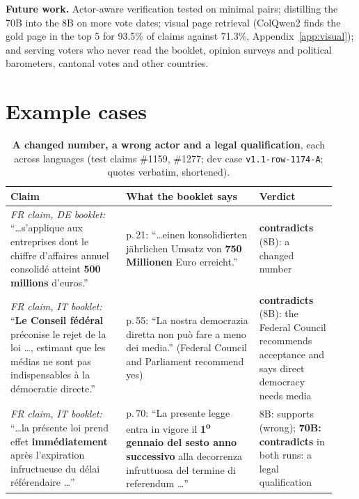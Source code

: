 \documentclass[10pt,a4paper]{article}
\begin{document}
\textbf{Future work.} Actor-aware verification tested on minimal pairs; distilling the 70B into the 8B
on more vote dates; visual page retrieval (ColQwen2 finds the gold page in the top 5 for 93.5\% of
claims against 71.3\%, Appendix~\ref{app:visual}); and serving voters who never read the booklet,
opinion surveys and political barometers, cantonal votes and other countries.

\footnotesize


\normalsize

\appendix
\section{Example cases}\label{app:cases}
\begin{table}[H]
\centering\footnotesize
\begin{tabular}{@{}L{0.33\linewidth}L{0.38\linewidth}L{0.22\linewidth}@{}}
\toprule
Claim & What the booklet says & Verdict \\
\midrule
\emph{FR claim, DE booklet:} ``\ldots s'applique aux entreprises dont le chiffre d'affaires annuel
consolidé atteint \textbf{500 millions} d'euros.'' &
p.\,21: ``\ldots einen konsolidierten jährlichen Umsatz von \textbf{750 Millionen} Euro erreicht.'' &
\textbf{contradicts} (8B): a changed number \\[3pt]
\emph{FR claim, IT booklet:} ``\textbf{Le Conseil fédéral} préconise le rejet de la loi \ldots,
estimant que les médias ne sont pas indispensables à la démocratie directe.'' &
p.\,55: ``La nostra democrazia diretta non può fare a meno dei media.'' (Federal Council and
Parliament recommend yes) &
\textbf{contradicts} (8B): the Federal Council recommends acceptance and says direct democracy needs media \\[3pt]
\emph{FR claim, IT booklet:} ``\ldots la présente loi prend effet \textbf{immédiatement} après
l'expiration infructueuse du délai référendaire \ldots'' &
p.\,70: ``La presente legge entra in vigore il \textbf{1\textsuperscript{o} gennaio del sesto anno successivo} alla
decorrenza infruttuosa del termine di referendum \ldots'' &
8B: supports (wrong); \textbf{70B: contradicts} in both runs: a legal qualification \\
\bottomrule
\end{tabular}
\caption{\textbf{A changed number, a wrong actor and a legal qualification}, each across languages
(test claims \#1159, \#1277; dev case \texttt{v1.1-row-1174-A}; quotes verbatim, shortened).}
\label{tab:cases}
\end{table}
\end{document}
